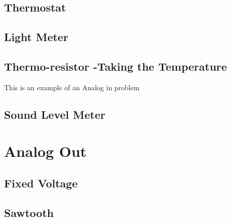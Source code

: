 \documentclass{article}
\begin{document}

\subsection{Thermostat} %
\label{sub:thermostat}


\subsection{Light Meter} %
\label{sub:light_meter}


\subsection{Thermo-resistor -Taking the Temperature} %
\label{sub:thermo_resistor_taking_the_temperature}

This is an example of an Analog in problem



\subsection{Sound Level Meter} %
\label{sub:sound_level_meter}





\section{Analog Out} %
\label{sec:analog_out}

\subsection{Fixed Voltage} %
\label{sub:fixed_voltage}


\subsection{Sawtooth} %
\label{sub:sawtooth}

\end{document}
